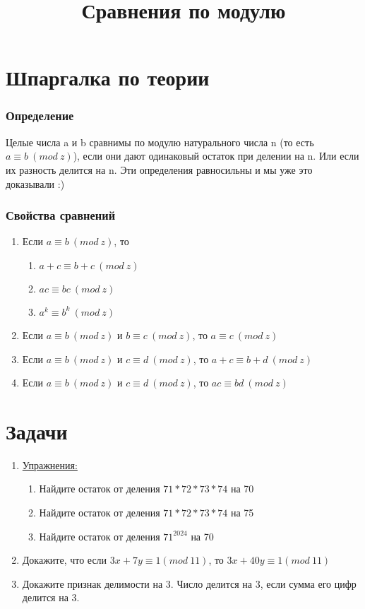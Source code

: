 \documentclass[a4paper,12pt]{article}
\title{Сравнения по модулю}
\begin{document}
\maketitle

\section*{Шпаргалка по теории}
    \subsubsection*{Определение}
    Целые числа a и b сравнимы по модулю натурального числа n (то есть $a \equiv b \ (mod \ z)$), если они дают одинаковый остаток при делении на n. Или если их разность делится на n. Эти определения равносильны и мы уже это доказывали :)
    \subsubsection*{Свойства сравнений}
    \begin{enumerate}
        \item Если $a \equiv b \ (mod \ z)$, то
        \begin{enumerate}
            \item $a + c \equiv b + c \ (mod \ z)$
            \item $ac \equiv bc \ (mod \ z)$
            \item $a^k \equiv b^k \ (mod \ z)$
        \end{enumerate}
        \item Если $a \equiv b \ (mod \ z)$ и $b \equiv c \ (mod \ z)$, то  $a \equiv c \ (mod \ z)$
        \item Если $a \equiv b \ (mod \ z)$ и $c \equiv d \ (mod \ z)$, то  $a + c \equiv b + d \ (mod \ z)$
        \item Если $a \equiv b \ (mod \ z)$ и $c \equiv d \ (mod \ z)$, то  $ac \equiv bd \ (mod \ z)$
    \end{enumerate}

\section*{Задачи}

\begin{enumerate}[label=\textbf{\arabic*.}]
    \item  \underline{Упражнения:} 
    \begin{enumerate}
        \item Найдите остаток от деления $71 * 72 * 73 * 74$ на 70
        \item Найдите остаток от деления $71 * 72 * 73 * 74$ на 75
        \item Найдите остаток от деления $71^{2024}$ на 70
    \end{enumerate}
    \item Докажите, что если $3x + 7y \equiv 1 (mod \ 11)$, то $3x + 40y \equiv 1 (mod \ 11)$
    \item Докажите признак делимости на 3. Число делится на 3, если сумма его цифр делится на 3.
\end{enumerate}
\end{document}
